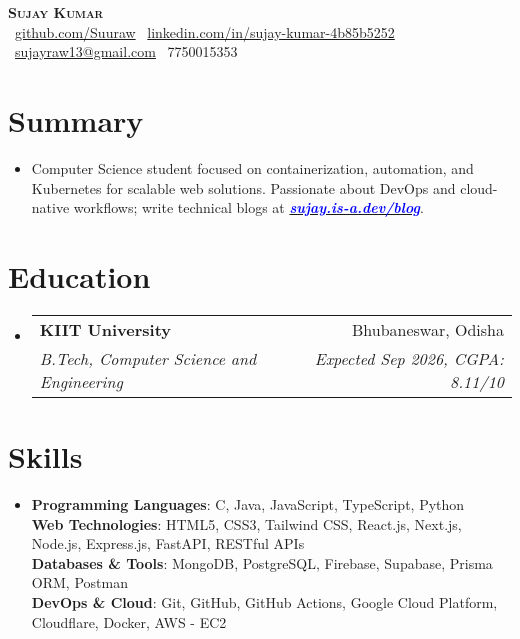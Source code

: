 \documentclass[letterpaper,11pt]{article}
\makeatletter
\newcommand{\resumeSubheading}[4]{
  \vspace{-3pt}\item
  \begin{tabular*}{0.98\textwidth}[t]{l@{\extracolsep{\fill}}r}
    \textbf{#1} & #2 \\
    \textit{\small#3} & \textit{\small #4} \\
  \end{tabular*}\vspace{-6pt}
}
\newcommand{\resumeSubHeadingListStart}{\begin{itemize}[leftmargin=0.1in, label={}]}
\newcommand{\resumeSubHeadingListEnd}{\end{itemize}\vspace{-6pt}}
\makeatother
\begin{document}
\begin{center}
  \textbf{\Huge \scshape Sujay Kumar} \\ \vspace{8pt}
  \small
  \vspace{2pt}
  \faGithub\ \href{https://github.com/Suuraw}{github.com/Suuraw} \quad
  \faLinkedin\ \href{https://linkedin.com/in/sujay-kumar-4b85b5252}{linkedin.com/in/sujay-kumar-4b85b5252} \quad
  \faEnvelope\ \href{mailto:sujayraw13@gmail.com}{sujayraw13@gmail.com} \quad
  \faPhone\ 7750015353
\end{center}
\vspace{-8pt}

\section{Summary}
\vspace{4pt}
\resumeSubHeadingListStart
\item{Computer Science student focused on containerization, automation, and Kubernetes for scalable web solutions. Passionate about DevOps and cloud-native workflows; write technical blogs at \href{https://sujay.is-a.dev/blog}{\textcolor{blue}{\textbf{\textit{sujay.is-a.dev/blog}}}}.}
\resumeSubHeadingListEnd

\section{Education}
\vspace{4pt}
\resumeSubHeadingListStart
  \resumeSubheading{KIIT University}{Bhubaneswar, Odisha}{B.Tech, Computer Science and Engineering}{Expected Sep 2026, CGPA: 8.11/10}
\resumeSubHeadingListEnd

\section{Skills}
\vspace{4pt}
\resumeSubHeadingListStart
  \item{
    \textbf{Programming Languages}: C, Java, JavaScript, TypeScript, Python \\ \vspace{2pt}
    \textbf{Web Technologies}: HTML5, CSS3, Tailwind CSS, React.js, Next.js, Node.js, Express.js, FastAPI, RESTful APIs \\ \vspace{2pt}
    \textbf{Databases \& Tools}: MongoDB, PostgreSQL, Firebase, Supabase, Prisma ORM, Postman \\ \vspace{2pt}
    \textbf{DevOps \& Cloud}: Git, GitHub, GitHub Actions, Google Cloud Platform, Cloudflare, Docker, AWS - EC2
  }
\resumeSubHeadingListEnd
\end{document}
